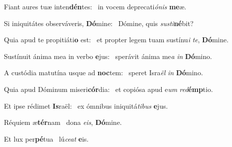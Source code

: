 \item Fiant aures tuæ inten\textbf{dén}tes:~\psstar{} in vocem deprecati\textit{ó}\textit{nis} \textbf{me}æ.

\item Si iniquitátes observáveris, \textbf{Dó}mine:~\psstar{} Dómine, quis \textit{sus}\textit{ti}\textbf{né}bit?

\item Quia apud te propitiáti\textbf{o} est:~\psstar{} et propter legem tuam sustínu\textit{i} \textit{te}, \textbf{Dó}mine.

\item Sustínuit ánima mea in verbo \textbf{e}jus:~\psstar{} sperávit ánima me\textit{a} \textit{in} \textbf{Dó}mino.

\item A custódia matutína usque ad \textbf{noc}tem:~\psstar{} speret Isra\textit{ël} \textit{in} \textbf{Dó}mino.

\item Quia apud Dóminum miseri\textbf{cór}dia:~\psstar{} et copiósa apud e\textit{um} \textit{red}\textbf{émp}tio.

\item Et ipse rédimet \textbf{Is}raël:~\psstar{} ex ómnibus iniquitá\textit{ti}\textit{bus} \textbf{e}jus.

\item Réquiem æ\textbf{tér}nam~\psstar{} dona \textit{e}\textit{is}, \textbf{Dó}mine.

\item Et lux per\textbf{pé}tua~\psstar{} lú\textit{ce}\textit{at} \textbf{e}is.